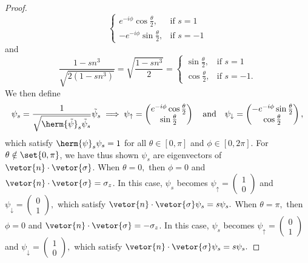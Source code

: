 \begin{proof}
\begin{equation*}
\begin{cases}
         e^{-i\phi} \cos\frac\theta2,&\text{if }s = 1\\
         - e^{-i\phi} \sin\frac\theta2,&\text{if }s = -1
      \end{cases}
   \end{equation*}
   and
   \begin{equation*}
      \frac{1 - s n^3}{\sqrt{2(1 - sn^3)}} = \sqrt{\frac{1 - sn^3}{2}} = \begin{cases}
         \sin\frac\theta2,&\text{if }s = 1\\
         \cos\frac\theta2,&\text{if }s = -1.
      \end{cases}
   \end{equation*}
   We then define
   \begin{equation*}
      \psi_s = \frac1{\sqrt{\herm{\tilde{\psi}}_s \tilde{\psi}_s}} \tilde{\psi}_s \implies 
      \psi_{\uparrow} = \begin{pmatrix}
         e^{-i\phi}\cos\frac\theta2\\
         \sin\frac\theta2
      \end{pmatrix}
      \quad\text{and}\quad
      \psi_\downarrow = \begin{pmatrix}
         -e^{-i\phi}\sin\frac\theta2\\
         \cos\frac\theta2
      \end{pmatrix},
   \end{equation*}
   which satisfy \(\herm{\psi}_s \psi_s = 1\) for all \(\theta \in [0,\pi]\) and \(\phi \in [0,2\pi].\)
   For \(\theta \notin \set{0, \pi}\), we have thus shown \(\psi_{s}\) are eigenvectors of \(\vetor{n}\cdot\vetor{\sigma}\). When \(\theta = 0,\) then \(\phi = 0\) and \(\vetor{n} \cdot \vetor{\sigma} = \sigma_z\). In this case, \(\psi_s\) becomes \(\psi_\uparrow = \left(\begin{smallmatrix} 1\\0 \end{smallmatrix}\right)\) and \(\psi_\downarrow = \left(\begin{smallmatrix} 0\\1 \end{smallmatrix}\right),\) which satisfy \(\vetor{n}\cdot\vetor{\sigma} \psi_s = s \psi_s.\) When \(\theta = \pi,\) then \(\phi = 0\) and \(\vetor{n}\cdot\vetor{\sigma} = - \sigma_z\). In this case, \(\psi_s\) becomes \(\psi_\uparrow = \left(\begin{smallmatrix} 0\\1 \end{smallmatrix}\right)\) and \(\psi_\downarrow = \left(\begin{smallmatrix} 1\\0 \end{smallmatrix}\right),\)  which satisfy \(\vetor{n}\cdot \vetor{\sigma} \psi_s = s\psi_s.\)
\end{proof}
